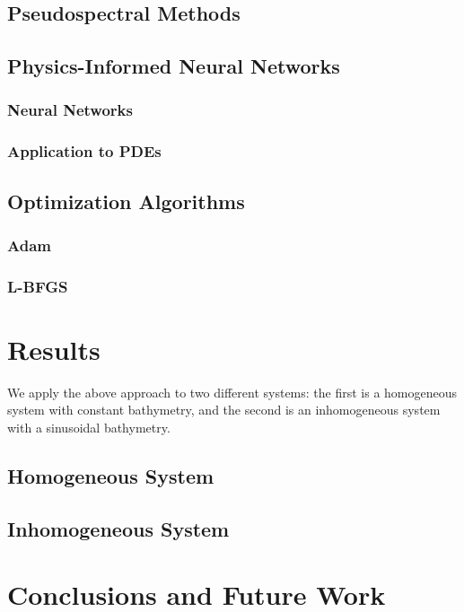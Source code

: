 \documentclass[letterpaper,12pt]{article}
\begin{document}
    \subsection{Pseudospectral Methods}\label{subsec:pseudospectral-methodology}
        

    \subsection{Physics-Informed Neural Networks}\label{subsec:pinn-methodology}
        \subsubsection{Neural Networks}
            
        \subsubsection{Application to PDEs}
            
            
    \subsection{Optimization Algorithms}
        
        \subsubsection{Adam}
            
        \subsubsection{L-BFGS}
            

    \section{Results}\label{sec:results}
    We apply the above approach to two different systems: the first is a homogeneous system with constant bathymetry,
    and the second is an inhomogeneous system with a sinusoidal bathymetry. 

    \subsection{Homogeneous System}\label{subsec:homogeneous-results}
        
    
    \subsection{Inhomogeneous System}\label{subsec:inhomogeneous-results}
        

    \section{Conclusions and Future Work}\label{sec:conclusion}
        

    \pagebreak

    
    

    \pagebreak
    \appendix
\end{document}
